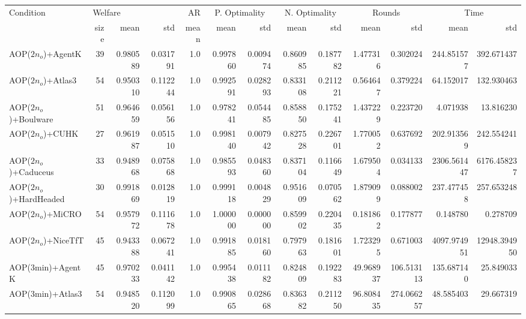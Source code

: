 \begin{tabular}{lrr|r|rr|rr|rr|rrr}
\toprule
                Condition & \multicolumn{3}{l}{Welfare} &   AR & \multicolumn{2}{c}{P. Optimality} & \multicolumn{2}{c}{N. Optimality} & \multicolumn{2}{c}{Rounds} & \multicolumn{2}{c}{Time} \\
                          &    size &     mean &      std & mean &          mean &      std &          mean &      std &         mean &          std &        mean &          std \\
\midrule
      AOP($2 n_o$)+AgentK &      39 & 0.980589 & 0.031791 &  1.0 &      0.997860 & 0.009474 &      0.860985 & 0.187782 &     1.477316 &     0.302024 &  244.851577 &   392.671437 \\
      AOP($2 n_o$)+Atlas3 &      54 & 0.950310 & 0.112244 &  1.0 &      0.992591 & 0.028293 &      0.833108 & 0.211221 &     0.564647 &     0.379224 &   64.152017 &   132.930463 \\
    AOP($2 n_o$)+Boulware &      51 & 0.964659 & 0.056156 &  1.0 &      0.978241 & 0.054485 &      0.858850 & 0.175241 &     1.437229 &     0.223720 &    4.071938 &    13.816230 \\
        AOP($2 n_o$)+CUHK &      27 & 0.961987 & 0.051510 &  1.0 &      0.998140 & 0.007942 &      0.827528 & 0.226701 &     1.770052 &     0.637692 &  202.913569 &   242.554241 \\
    AOP($2 n_o$)+Caduceus &      33 & 0.948968 & 0.075868 &  1.0 &      0.985593 & 0.048360 &      0.837104 & 0.116649 &     1.679504 &     0.034133 & 2306.561447 &  6176.458237 \\
  AOP($2 n_o$)+HardHeaded &      30 & 0.991869 & 0.012819 &  1.0 &      0.999118 & 0.004829 &      0.951609 & 0.070562 &     1.879099 &     0.088002 &  237.477458 &   257.653248 \\
       AOP($2 n_o$)+MiCRO &      54 & 0.957972 & 0.111678 &  1.0 &      1.000000 & 0.000000 &      0.859902 & 0.220435 &     0.181862 &     0.177877 &    0.148780 &     0.278709 \\
     AOP($2 n_o$)+NiceTfT &      45 & 0.943388 & 0.067241 &  1.0 &      0.991885 & 0.018160 &      0.797963 & 0.181601 &     1.723295 &     0.671003 & 4097.974951 & 12948.394950 \\
         AOP(3min)+AgentK &      45 & 0.970233 & 0.041142 &  1.0 &      0.995438 & 0.011182 &      0.824809 & 0.192283 &    49.968937 &   106.513113 &  135.687140 &    25.849033 \\
         AOP(3min)+Atlas3 &      54 & 0.948520 & 0.112099 &  1.0 &      0.990865 & 0.028668 &      0.836382 & 0.211250 &    96.808435 &   274.066257 &   48.585403 &    29.667319 \\

\end{tabular}
